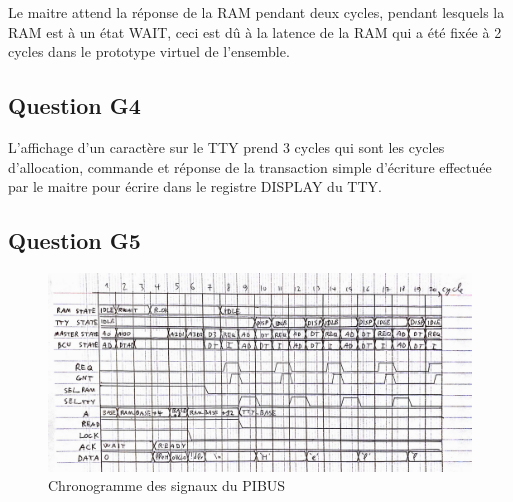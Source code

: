 \documentclass{article}
\begin{document}
Le maitre attend la réponse de la RAM pendant deux cycles, pendant lesquels
la RAM est à un état WAIT, ceci est dû à la latence de la RAM qui a été
fixée à 2 cycles dans le prototype virtuel de l'ensemble.

\subsection{Question G4}

L'affichage d'un caractère sur le TTY prend 3 cycles qui sont les cycles
d'allocation, commande et réponse de la transaction simple d'écriture
effectuée par le maitre pour écrire dans le registre DISPLAY du TTY.

\subsection{Question G5}

\begin{figure}[H]
\includegraphics[width=\textwidth]{pics/chrono.png}
\centering
\caption{Chronogramme des signaux du PIBUS}
\label{mae_ram}
\end{figure}






\end{document}

